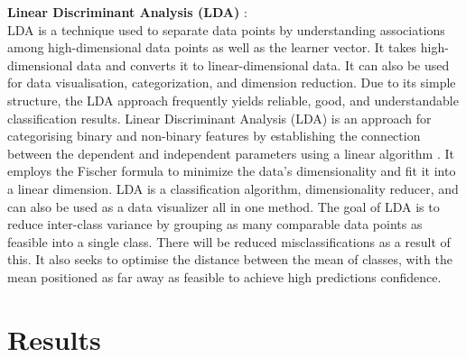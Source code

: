\documentclass[11pt,a4paper]{article}
\begin{document}
\textbf{Linear Discriminant Analysis (LDA) }: \\
LDA is a technique used to separate data points by understanding associations among high-dimensional data points as well as the learner vector. It takes high-dimensional data and converts it to linear-dimensional data. It can also be used for data visualisation, categorization, and dimension reduction. Due to its simple structure, the LDA approach frequently yields reliable, good, and understandable classification results. Linear Discriminant Analysis (LDA) is an approach for categorising binary and non-binary features by establishing the connection between the dependent and independent parameters using a linear algorithm \cite{abuzeina2018employing}. It employs the Fischer formula to minimize the data's dimensionality and fit it into a linear dimension. LDA is a classification algorithm, dimensionality reducer, and can also be used as a data visualizer all in one method. The goal of LDA is to reduce inter-class variance by grouping as many comparable data  points as feasible into a single class. There will be reduced misclassifications as a result of this. It also seeks to optimise the distance between the mean of classes, with the mean positioned as far away as feasible to achieve high predictions confidence. 

\section{Results}
 
\end{document}
